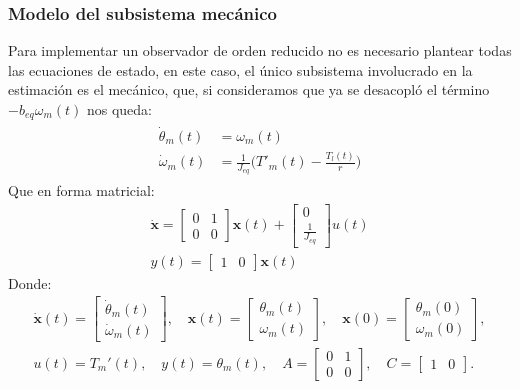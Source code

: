 \documentclass[12pt, a4paper,journal, onecolumn, compsoc]{IEEEtran}
\begin{document}
\subsubsection{Modelo del subsistema mecánico}
Para implementar un observador de orden reducido no es necesario plantear todas las ecuaciones de estado, en este caso, el único subsistema involucrado en la estimación es el mecánico, que, si consideramos que ya se desacopló el término $-b_{eq}\omega_m(t)$ nos queda:
\begin{gather}
\begin{aligned}
    \dot\theta_m(t) &= \omega_m(t) \\
    \dot \omega_m(t) &= \frac{1}{J_{eq}}\Big(T'_m(t)-\frac{T_l(t)}{r}\Big)
\end{aligned}
\end{gather}
Que en forma matricial:
\begin{gather*}
    \bm{\dot x}
=
\begin{bmatrix}
    0 & 1 \\ 0 & 0
\end{bmatrix}
\bm{x}(t)
+
\begin{bmatrix}
    0 \\ \frac{1}{J_{eq}} 
\end{bmatrix}
    u(t)
\\
y(t) =
\begin{bmatrix}
    1 & 0
\end{bmatrix}
\bm{x}(t)
\end{gather*}
Donde:
\begin{gather*}
\bm{\dot x}(t)=
\begin{bmatrix}
    \dot\theta_m(t) \\ \dot\omega_m(t)
\end{bmatrix},
\quad
\bm{x}(t)=
\begin{bmatrix}
    \theta_m(t) \\ \omega_m(t)
\end{bmatrix},
\quad
\bm{x}(0)=
\begin{bmatrix}
    \theta_m(0) \\ \omega_m(0)
\end{bmatrix}, \\[6pt]
u(t)=T_m'(t),
\quad
y(t)=\theta_m(t),
\quad
A=\begin{bmatrix}
    0 & 1\\ 0 & 0
\end{bmatrix},
\quad
C=\begin{bmatrix}
    1 & 0
\end{bmatrix}.
\end{gather*}
    
\end{document}
